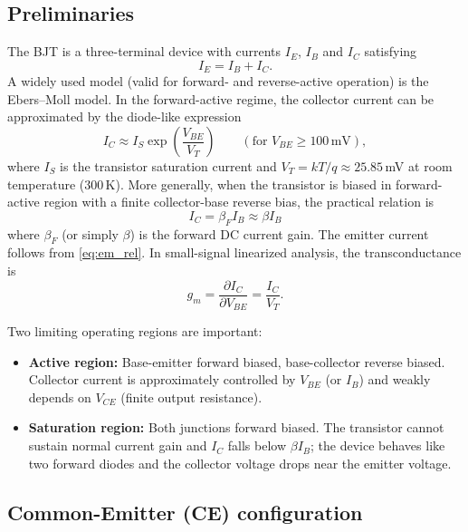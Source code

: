 \documentclass[12pt,a4paper]{article}
\begin{document}
\subsection{Preliminaries}
The BJT is a three-terminal device with currents $I_E$, $I_B$ and $I_C$ satisfying
\begin{equation}
  I_E = I_B + I_C.\label{eq:em_rel}
\end{equation}
A widely used model (valid for forward- and reverse-active operation) is the Ebers--Moll model. In the forward-active regime, the collector current can be approximated by the diode-like expression
\begin{equation}
  I_C \approx I_{S} \exp\left(\frac{V_{BE}}{V_T}\right)\qquad (\text{for }V_{BE}\geq 100\,\text{mV}),\label{eq:ic_exp}
\end{equation}
where $I_S$ is the transistor saturation current and $V_T=kT/q\approx 25.85\,$mV at room temperature ($300\,$K). More generally, when the transistor is biased in forward-active region with a finite collector-base reverse bias, the practical relation is
\begin{equation}
  I_C = \beta_F I_B\approx \beta I_B\label{eq:ic_beta_ib}
\end{equation}
where $\beta_F$ (or simply $\beta$) is the forward DC current gain. The emitter current follows from \eqref{eq:em_rel}. In small-signal linearized analysis, the transconductance is
\begin{equation}
  g_m = \frac{\partial I_C}{\partial V_{BE}} = \frac{I_C}{V_T}.\label{eq:gm}
\end{equation}

Two limiting operating regions are important:
\begin{itemize}
  \item \textbf{Active region:} Base-emitter forward biased, base-collector reverse biased. Collector current is approximately controlled by $V_{BE}$ (or $I_B$) and weakly depends on $V_{CE}$ (finite output resistance).
  \item \textbf{Saturation region:} Both junctions forward biased. The transistor cannot sustain normal current gain and $I_C$ falls below $\beta I_B$; the device behaves like two forward diodes and the collector voltage drops near the emitter voltage.
\end{itemize}

\subsection{Common-Emitter (CE) configuration}
\end{document}
